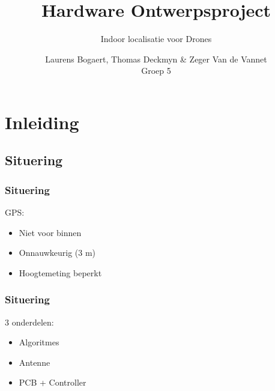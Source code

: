 \documentclass{beamer}
\title{\textbf{Hardware Ontwerpsproject}}
\subtitle{Indoor localisatie voor Drones}
\author{Laurens Bogaert, Thomas Deckmyn \& Zeger Van de Vannet\\Groep 5}
\begin{document}
\begin{frame}
  \titlepage
\end{frame}

\section{Inleiding}
\subsection{Situering}
  \begin{frame}
    \frametitle{Situering}
    GPS:
    \begin{itemize}
        \item Niet voor binnen
        \item Onnauwkeurig (3 m)
        \item Hoogtemeting beperkt
    \end{itemize}
  \end{frame}
  \begin{frame}
    \frametitle{Situering}
    3 onderdelen:
    \begin{itemize}
      \item Algoritmes
      \item Antenne
      \item PCB + Controller
    \end{itemize}
  \end{frame}
\end{document}

